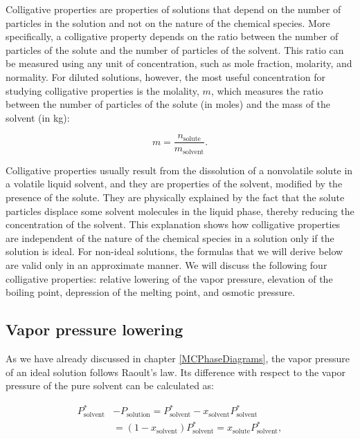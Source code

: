 \documentclass[
  9pt,
]{extbook}
\theoremstyle{definition}
\theoremstyle{definition}
\theoremstyle{definition}
\theoremstyle{definition}
\theoremstyle{remark}
\begin{document}
Colligative properties are properties of solutions that depend on the number of particles in the solution and not on the nature of the chemical species. More specifically, a colligative property depends on the ratio between the number of particles of the solute and the number of particles of the solvent. This ratio can be measured using any unit of concentration, such as mole fraction, molarity, and normality. For diluted solutions, however, the most useful concentration for studying colligative properties is the molality, \(m\), which measures the ratio between the number of particles of the solute (in moles) and the mass of the solvent (in kg):

\begin{equation}
m = \frac{n_{\text{solute}}}{m_{\text{solvent}}}.
\label{eq:coll1}
\end{equation}

Colligative properties usually result from the dissolution of a nonvolatile solute in a volatile liquid solvent, and they are properties of the solvent, modified by the presence of the solute. They are physically explained by the fact that the solute particles displace some solvent molecules in the liquid phase, thereby reducing the concentration of the solvent. This explanation shows how colligative properties are independent of the nature of the chemical species in a solution only if the solution is ideal. For non-ideal solutions, the formulas that we will derive below are valid only in an approximate manner. We will discuss the following four colligative properties: relative lowering of the vapor pressure, elevation of the boiling point, depression of the melting point, and osmotic pressure.

\subsection{Vapor pressure lowering}\label{vapor-pressure-lowering}

As we have already discussed in chapter \ref{MCPhaseDiagrams}, the vapor pressure of an ideal solution follows Raoult's law. Its difference with respect to the vapor pressure of the pure solvent can be calculated as:

\begin{equation}
\begin{aligned}
P_{\text{solvent}}^* &- P_{\text{solution}} = P_{\text{solvent}}^* - x_{\text{solvent}} P_{\text{solvent}}^* \\ 
& = \left( 1-x_{\text{solvent}}\right)P_{\text{solvent}}^* =x_{\text{solute}} P_{\text{solvent}}^*,
\end{aligned}
\label{eq:coll2}
\end{equation}
\end{document}
